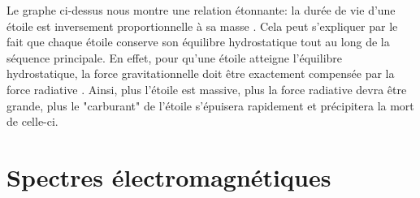 Le graphe ci-dessus nous montre une relation étonnante: la durée de vie d'une étoile est inversement proportionnelle à sa masse . Cela peut s'expliquer par le fait que chaque étoile conserve son équilibre hydrostatique tout au long de la séquence principale. En effet, pour qu'une étoile atteigne l'équilibre hydrostatique, la force gravitationnelle doit être exactement compensée par la force radiative . Ainsi, plus l'étoile est massive, plus la force radiative devra être grande, plus le "carburant" de l'étoile s'épuisera rapidement et précipitera la mort de celle-ci.



\chapter{Spectres électromagnétiques}\label{Annexe D}
\vspace{1.5cm}
